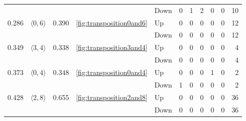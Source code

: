 \documentclass{article}
\begin{document}
\begin{center}
\begin{tabular}{lllllrrrrrr}
 &  &  &  & Down & 0 & 1 & 2 & 0 & 0 & 10 \\
\cline{1-11} \cline{2-11} \cline{3-11} \cline{4-11}
\multirow[t]{2}{*}{0.286} & \multirow[t]{2}{*}{$\langle0, 6\rangle$} & \multirow[t]{2}{*}{0.390} & \multirow[t]{2}{*}{\ref{fig:transposition0and6}} & Up & 0 & 0 & 0 & 0 & 0 & 12 \\
 &  &  &  & Down & 0 & 0 & 0 & 0 & 0 & 12 \\
\cline{1-11} \cline{2-11} \cline{3-11} \cline{4-11}
\multirow[t]{2}{*}{0.349} & \multirow[t]{2}{*}{$\langle3, 4\rangle$} & \multirow[t]{2}{*}{0.338} & \multirow[t]{2}{*}{\ref{fig:transposition3and4}} & Up & 0 & 0 & 0 & 0 & 0 & 4 \\
 &  &  &  & Down & 0 & 0 & 0 & 0 & 0 & 4 \\
\cline{1-11} \cline{2-11} \cline{3-11} \cline{4-11}
\multirow[t]{2}{*}{0.373} & \multirow[t]{2}{*}{$\langle0, 4\rangle$} & \multirow[t]{2}{*}{0.348} & \multirow[t]{2}{*}{\ref{fig:transposition0and4}} & Up & 0 & 0 & 0 & 1 & 0 & 2 \\
 &  &  &  & Down & 1 & 0 & 0 & 0 & 0 & 2 \\
\cline{1-11} \cline{2-11} \cline{3-11} \cline{4-11}
\multirow[t]{2}{*}{0.428} & \multirow[t]{2}{*}{$\langle2, 8\rangle$} & \multirow[t]{2}{*}{0.655} & \multirow[t]{2}{*}{\ref{fig:transposition2and8}} & Up & 0 & 0 & 0 & 0 & 0 & 36 \\
 &  &  &  & Down & 0 & 0 & 0 & 0 & 0 & 36 \\
\cline{1-11} \cline{2-11} \cline{3-11} \cline{4-11}
\bottomrule
\end{tabular}


\end{center}
\end{document}
